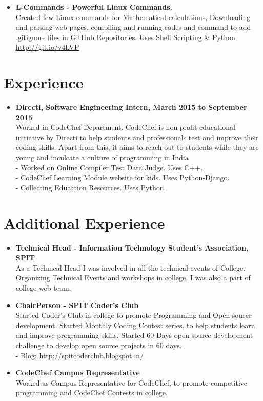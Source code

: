 \documentclass[margin,line]{res}
\begin{document}
\begin{resume}
\begin{itemize}
\item \textbf{L-Commands - Powerful Linux Commands.}\\
Created few Linux commands for Mathematical calculations, Downloading and parsing web pages, compiling and running codes and command to add .gitignore files in GitHub Repositories. Uses Shell Scripting \& Python.\\
\url{http://git.io/v4LVP}

\end{itemize}



\section{Experience}
\begin{itemize} \itemsep -4pt

\item\textbf{Directi, Software Engineering Intern, March 2015 to September 2015}\\
Worked in CodeChef Department. CodeChef is non-profit educational initiative by Directi to help students and professionals test and improve their coding skills. Apart from this, it aims to reach out to students while they are young and inculcate a culture of programming in India\\
- Worked on Online Compiler Test Data Judge. Uses C++. \\
- CodeChef Learning Module website for kids. Uses Python-Django.\\
- Collecting Education Resources. Uses Python.

\end{itemize}

\section{Additional Experience}
\begin{itemize} \itemsep -4pt
 \item\textbf{Technical Head - Information Technology Student's Association, SPIT }\\
As a Technical Head I was involved in all the technical events of College. Organizing Technical Events and workshops in college. I was also a part of college web team.\\

 \item\textbf{ChairPerson -  SPIT Coder's Club}\\
Started Coder's Club in college to promote Programming and Open source development. Started Monthly Coding Contest series, to help students learn and improve programming skills. Started 60 Days open source development challenge to develop open source projects in 60 days.\\
- Blog: \url{http://spitcoderclub.blogspot.in/}
\\
\item\textbf{CodeChef Campus Representative}\\
Worked as Campus Representative for CodeChef, to promote competitive programming and CodeChef Contests in college.
\end{itemize}



\end{resume}
\end{document}
